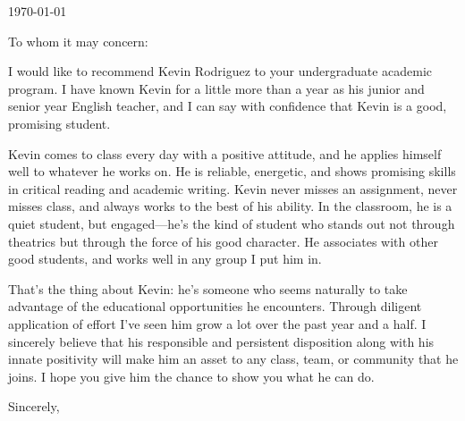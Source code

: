 \documentclass[11pt, letterpaper]{letter} %
\begin{document}

\begin{letter}{
	\today\\	
}


\opening{To whom it may concern:}

I would like to recommend Kevin Rodriguez to your undergraduate academic program. I have known Kevin for a little more than a year as his junior and senior year English teacher, and I can say with confidence that Kevin is a good, promising student.

Kevin comes to class every day with a positive attitude, and he applies himself well to whatever he works on. He is reliable, energetic, and shows promising skills in critical reading and academic writing. Kevin never misses an assignment, never misses class, and always works to the best of his ability. In the classroom, he is a quiet student, but engaged---he's the kind of student who stands out not through theatrics but through the force of his good character. He associates with other good students, and works well in any group I put him in.

That's the thing about Kevin: he's someone who seems naturally to take advantage of the educational opportunities he encounters. Through diligent application of effort I've seen him grow a lot over the past year and a half. I sincerely believe that his responsible and persistent disposition along with his innate positivity will make him an asset to any class, team, or community that he joins. I hope you give him the chance to show you what he can do.

\closing{Sincerely,}




\end{letter}
\end{document}

